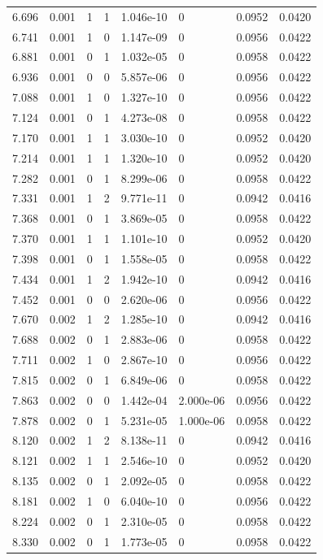 \documentclass[preview]{standalone}
\begin{document}
{{{\begin{tabular}{L{1.2cm}C{1.2cm} C{0.3cm}C{0.5cm} C{1.4cm}C{1.4cm} C{1.4cm}C{1.4cm}}
  6.696  &  0.001  & 1     &  1 &  1.046e-10  & 0  & 0.0952 &  0.0420   \\ 
  6.741  &  0.001  & 1     &  0 &  1.147e-09  & 0  & 0.0956 &  0.0422   \\ 
  6.881  &  0.001  & 0     &  1 &  1.032e-05  & 0  & 0.0958 &  0.0422   \\ 
  6.936  &  0.001  & 0     &  0 &  5.857e-06  & 0  & 0.0956 &  0.0422   \\ 
  7.088  &  0.001  & 1     &  0 &  1.327e-10  & 0  & 0.0956 &  0.0422   \\ 
  7.124  &  0.001  & 0     &  1 &  4.273e-08  & 0  & 0.0958 &  0.0422   \\ 
  7.170  &  0.001  & 1     &  1 &  3.030e-10  & 0  & 0.0952 &  0.0420   \\ 
  7.214  &  0.001  & 1     &  1 &  1.320e-10  & 0  & 0.0952 &  0.0420   \\ 
  7.282  &  0.001  & 0     &  1 &  8.299e-06  & 0  & 0.0958 &  0.0422   \\ 
  7.331  &  0.001  & 1     &  2 &  9.771e-11  & 0  & 0.0942 &  0.0416   \\ 
  7.368  &  0.001  & 0     &  1 &  3.869e-05  & 0  & 0.0958 &  0.0422   \\ 
  7.370  &  0.001  & 1     &  1 &  1.101e-10  & 0  & 0.0952 &  0.0420   \\ 
  7.398  &  0.001  & 0     &  1 &  1.558e-05  & 0  & 0.0958 &  0.0422   \\ 
  7.434  &  0.001  & 1     &  2 &  1.942e-10  & 0  & 0.0942 &  0.0416   \\ 
  7.452  &  0.001  & 0     &  0 &  2.620e-06  & 0  & 0.0956 &  0.0422   \\ 
  7.670  &  0.002  & 1     &  2 &  1.285e-10  & 0  & 0.0942 &  0.0416   \\ 
  7.688  &  0.002  & 0     &  1 &  2.883e-06  & 0  & 0.0958 &  0.0422   \\ 
  7.711  &  0.002  & 1     &  0 &  2.867e-10  & 0  & 0.0956 &  0.0422   \\ 
  7.815  &  0.002  & 0     &  1 &  6.849e-06  & 0  & 0.0958 &  0.0422   \\ 
  7.863  &  0.002  & 0     &  0 &  1.442e-04  & 2.000e-06  & 0.0956 &  0.0422   \\ 
  7.878  &  0.002  & 0     &  1 &  5.231e-05  & 1.000e-06  & 0.0958 &  0.0422   \\ 
  8.120  &  0.002  & 1     &  2 &  8.138e-11  & 0  & 0.0942 &  0.0416   \\ 
  8.121  &  0.002  & 1     &  1 &  2.546e-10  & 0  & 0.0952 &  0.0420   \\ 
  8.135  &  0.002  & 0     &  1 &  2.092e-05  & 0  & 0.0958 &  0.0422   \\ 
  8.181  &  0.002  & 1     &  0 &  6.040e-10  & 0  & 0.0956 &  0.0422   \\ 
  8.224  &  0.002  & 0     &  1 &  2.310e-05  & 0  & 0.0958 &  0.0422   \\ 
  8.330  &  0.002  & 0     &  1 &  1.773e-05  & 0  & 0.0958 &  0.0422   \\ 
\hline 
\end{tabular} 

}}}
\end{document}
